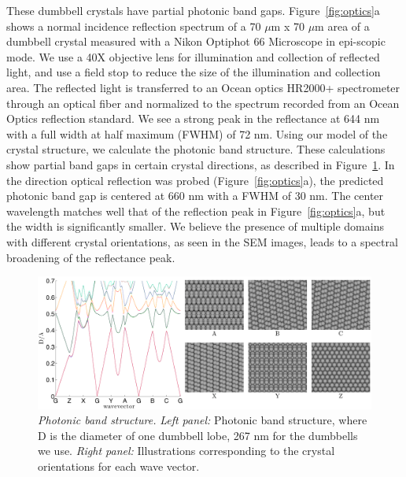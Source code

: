 These dumbbell crystals have partial photonic band gaps.
Figure~\ref{fig:optics}a shows a normal incidence reflection spectrum of a 70 $\mu$m x 70 $\mu$m area of a dumbbell crystal measured with a Nikon Optiphot 66 Microscope in epi-scopic mode.
We use a 40X objective lens for illumination and collection of reflected light, and use a field stop to reduce the size of the illumination and collection area.
The reflected light is transferred to an Ocean optics HR2000+ spectrometer through an optical fiber and normalized to the spectrum recorded from an Ocean Optics reflection standard.
We see a strong peak in the reflectance at 644 nm with a full width at half maximum (FWHM) of 72 nm.
Using our model of the crystal structure, we calculate the photonic band structure.
These calculations show partial band gaps in certain crystal directions, as described in Figure~\ref{fig:band-structure}.
In the direction optical reflection was probed (Figure~\ref{fig:optics}a), the predicted photonic band gap is centered at 660 nm with a FWHM of 30 nm.
The center wavelength matches well that of the reflection peak in Figure~\ref{fig:optics}a, but the width is significantly smaller.
We believe the presence of multiple domains with different crystal orientations, as seen in the SEM images, leads to a spectral broadening of the reflectance peak.

\begin{figure}[htbp]
\centering
\includegraphics[width=1.0\textwidth]{figures/CsuppFigure9.pdf}
\caption{\label{fig:band-structure}\emph{Photonic band structure.}
  	\emph{Left panel:} Photonic band structure, where D is the diameter of one dumbbell lobe, 267 nm for the dumbbells we use.
	\emph{Right panel:} Illustrations corresponding to the crystal orientations for each wave vector.}
\end{figure}

